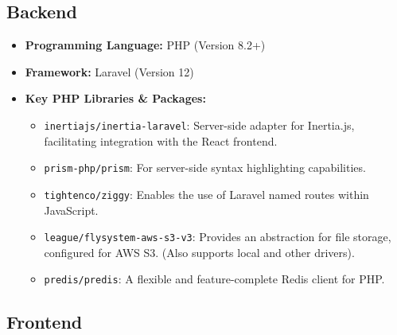 \subsection*{Backend}

\begin{itemize}
    \item \textbf{Programming Language:} PHP (Version 8.2+)
    \item \textbf{Framework:} Laravel (Version 12)
    \item \textbf{Key PHP Libraries \& Packages:}
    \begin{itemize}
        \item \texttt{inertiajs/inertia-laravel}: Server-side adapter for Inertia.js, facilitating integration with the React frontend.
        \item \texttt{prism-php/prism}: For server-side syntax highlighting capabilities.
        \item \texttt{tightenco/ziggy}: Enables the use of Laravel named routes within JavaScript.
        \item \texttt{league/flysystem-aws-s3-v3}: Provides an abstraction for file storage, configured for AWS S3. (Also supports local and other drivers).
        \item \texttt{predis/predis}: A flexible and feature-complete Redis client for PHP.
    \end{itemize}
\end{itemize}

\subsection*{Frontend}

